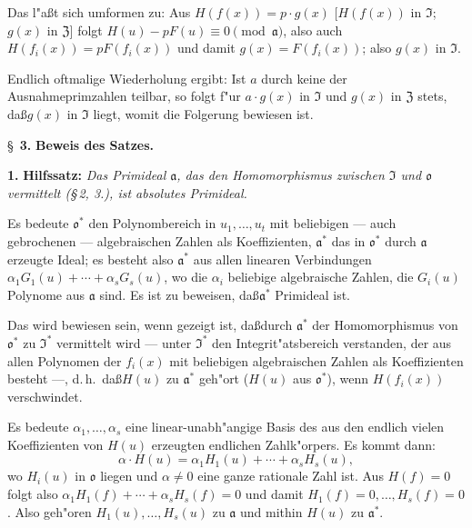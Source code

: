 Das l"a\ss t sich umformen zu: Aus $H(f(x)) = p \cdot g(x)$ [$H(f(x))$ in $\mathfrak{I}$; $g(x)$ in $\mathfrak{Z}$] folgt $H(u) - pF(u) \equiv 0 \pmod{\mathfrak{a}}$, also auch $H(f_i(x)) = pF(f_i(x))$ und damit $g(x) = F(f_i(x))$; also $g(x)$ in $\mathfrak{I}$.

Endlich oftmalige Wiederholung ergibt: Ist $a$ durch keine der Ausnahmeprimzahlen teilbar, so folgt f"ur $a \cdot g(x)$ in $\mathfrak{I}$ und $g(x)$ in $\mathfrak{Z}$ stets, da\ss $g(x)$ in $\mathfrak{I}$ liegt, womit die Folgerung bewiesen ist.

\newpage
\S~\textbf{3.}
\textbf{Beweis des Satzes.}

\smallskip

\noindent\textbf{1.} \textbf{Hilfssatz:}
\textit{Das Primideal $\mathfrak{a}$, das den Homomorphismus zwischen $\mathfrak{I}$ und $\mathfrak{o}$ vermittelt (\S\,2, 3.), ist absolutes Primideal.}

Es bedeute $\mathfrak{o}^*$ den Polynombereich in $u_1,\ldots,u_t$ mit beliebigen --- auch gebrochenen --- algebraischen Zahlen als Koeffizienten, $\mathfrak{a}^*$ das in $\mathfrak{o}^*$ durch $\mathfrak{a}$ erzeugte Ideal; es besteht also $\mathfrak{a}^*$ aus allen linearen Verbindungen $\alpha_1 G_1(u) + \cdots + \alpha_s G_s(u)$, wo die $\alpha_i$ beliebige algebraische Zahlen, die $G_i(u)$ Polynome aus $\mathfrak{a}$ sind. Es ist zu beweisen, da\ss $\mathfrak{a}^*$ Primideal ist.

Das wird bewiesen sein, wenn gezeigt ist, da\ss durch $\mathfrak{a}^*$ der Homomorphismus von $\mathfrak{o}^*$ zu $\mathfrak{I}^*$ vermittelt wird --- unter $\mathfrak{I}^*$ den Integrit"atsbereich verstanden, der aus allen Polynomen der $f_i(x)$ mit beliebigen algebraischen Zahlen als Koeffizienten besteht ---, d.\,h.\ da\ss $H(u)$ zu $\mathfrak{a}^*$ geh"ort ($H(u)$ aus $\mathfrak{o}^*$), wenn $H(f_i(x))$ verschwindet.

Es bedeute $\alpha_1,\ldots,\alpha_s$ eine linear-unabh"angige Basis des aus den endlich vielen Koeffizienten von $H(u)$ erzeugten endlichen Zahlk"orpers. Es kommt dann:
\[
\alpha \cdot H(u) = \alpha_1 H_1(u) + \cdots + \alpha_s H_s(u),
\]
wo $H_i(u)$ in $\mathfrak{o}$ liegen und $\alpha \neq 0$ eine ganze rationale Zahl ist. Aus $H(f) = 0$ folgt also $\alpha_1 H_1(f) + \cdots + \alpha_s H_s(f) = 0$ und damit $H_1(f) = 0,\ldots, H_s(f) = 0$. Also geh"oren $H_1(u),\ldots,H_s(u)$ zu $\mathfrak{a}$ und mithin $H(u)$ zu $\mathfrak{a}^*$.

